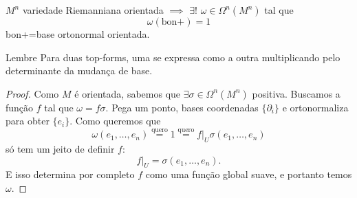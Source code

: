 \begin{prop}\leavevmode
\(M^n\) variedade Riemanniana orientada  \(\implies\) \(\exists !\) \(\omega \in \Omega^{n}(M^n)\) tal que
\[\omega(\text{bon+} )=1\]
bon+=base ortonormal orientada.
\end{prop}

\begin{thing6}{Lembre}\leavevmode
Para duas top-forms, uma se expressa como a outra multiplicando pelo determinante da mudança de base.
\end{thing6}

\begin{proof}\leavevmode
Como \(M\) é orientada, sabemos que \(\exists  \sigma \in \Omega^{n}(M^n)\) positiva. Buscamos a função \(f\) tal que \(\omega=f\sigma\). Pega um ponto, bases coordenadas \(\{\partial_i\}\) e ortonormaliza para obter \(\{e_i\}\). Como queremos que
\[\omega(e_1,\ldots,e_n)\overset{\text{quero}}{=}1\overset{\text{quero}}{=}f|_{U}\sigma(e_1,\ldots,e_n)\]
só tem um jeito de definir \(f\):
\[f|_{U}=\sigma(e_1,\ldots,e_n).\]
E isso determina por completo \(f\) como uma função global suave, e portanto temos \(\omega\).
\end{proof}



